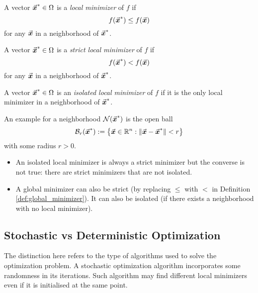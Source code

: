 \begin{definition}\label{def:local_minimizer}
A vector \(\vec{\boldsymbol{x}}^{*}\in\Omega\) is a \emph{local minimizer} of \(f\) if
\[
f(\vec{\boldsymbol{x}}^{*})\leq f(\vec{\boldsymbol{x}})
\]
for any \(\vec{\boldsymbol{x}}\) in a neighborhood of \(\vec{\boldsymbol{x}}^{*}\).
\end{definition}

\begin{definition}\label{def:strict_local_minimizer}
A vector \(\vec{\boldsymbol{x}}^{*}\in\Omega\) is a \emph{strict local minimizer} of \(f\) if
\[
f(\vec{\boldsymbol{x}}^{*})<f(\vec{\boldsymbol{x}})
\]
for any \(\vec{\boldsymbol{x}}\) in a neighborhood of \(\vec{\boldsymbol{x}}^{*}\).
\end{definition}

\begin{definition}
A vector \(\vec{\boldsymbol{x}}^{*}\in\Omega\) is an \emph{isolated local minimizer} of \(f\) if it is the only local minimizer in a neighborhood of \(\vec{\boldsymbol{x}}^{*}\).
\end{definition}


\begin{remark}
  An example for a neighborhood \(\mathcal{N}(\vec{\boldsymbol{x}}^{*})\) is the open ball
\[
\mathcal{B}_{r}(\vec{\boldsymbol{x}}^{*}) := \left\{ \vec{\boldsymbol{x}}\in\mathbb{R}^{n} : \|\vec{\boldsymbol{x}}-\vec{\boldsymbol{x}}^{*}\|<r \right\}
\]
with some radius \(r>0\).
\end{remark}

\begin{remark}\leavevmode %
\begin{itemize}
  \item An isolated local minimizer is always a strict minimizer but the converse is not true: there are strict minimizers that are not isolated.
  \item A global minimizer can also be strict (by replacing \(\leq\) with \(<\) in Definition \ref{def:global_minimizer}). It can also be isolated (if there exists a neighborhood with no local minimizer).\qedhere
\end{itemize}
\end{remark}


\subsection{Stochastic vs Deterministic Optimization}

The distinction here refers to the type of algorithms used to solve the optimization problem. 
A stochastic optimization algorithm incorporates some randomness in its iterations. 
Such algorithm may find different local minimizers even if it is initialised at the same point.




